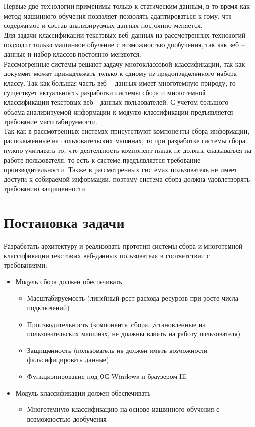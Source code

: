 \documentclass[russian, utf8, emptystyle]{eskdtext}
\begin{document}
Первые две технологии применимы только к статическим данным, в то время как метод машинного обучения позволяет позволять адаптироваться к тому, что содержимое и состав анализируемых данных постоянно меняется.\\
Для задачи классификации текстовых веб–данных из рассмотренных технологий подходит только машинное обучение с возможностью дообучения, так как веб – данные и набор классов постоянно меняются. \\
Рассмотренные системы решают задачу многоклассовой классификации, так как документ может принадлежать только к одному из предопределенного набора классу. Так как большая часть веб – данных имеет многотемную природу, то существует актуальность разработки системы сбора и многотемной классификации текстовых веб - данных пользователей. С учетом большого объема анализируемой информации к модулю классификации предъявляется требование масштабируемости. \\

Так как в рассмотренных системах присутствуют компоненты сбора информации, расположенные на пользовательских машинах, то при разработке системы сбора нужно учитывать то, что деятельность компонент никак не должна сказываться на работе пользователя, то есть к системе предъявляется требование производительности. Также в рассмотренных системах пользователь не имеет доступа к собираемой информации, поэтому система сбора должна удовлетворять требованию защищенности.
\section{Постановка задачи}
Разработать архитектуру и реализовать прототип системы сбора и многотемной классификации текстовых веб-данных пользователя в соответствии  с требованиями:
\begin{itemize}
	\item Модуль сбора должен обеспечивать
	\begin{itemize}
		\item Масштабируемость (линейный рост расхода ресурсов при росте числа подключений)
		\item Производительность (компоненты сбора, установленные на пользовательских машинах, не должны влиять на работу пользователя)
		\item Защищенность (пользователь не должен иметь возможности фальсифицировать данные)
		\item Функционирование под ОС Windows и браузером IE 
	\end{itemize}
	\item Модуль классификации должен обеспечивать
		\begin{itemize}
			\item Многотемную классификацию на основе машинного обучения с возможностью дообучения
		\end{itemize}
\end{itemize}
\end{document}
